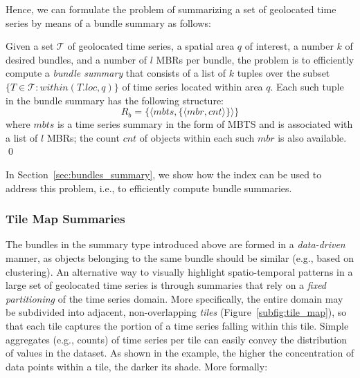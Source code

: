 


Hence, we can formulate the problem of summarizing a set of geolocated time series by means of a bundle summary as follows:

\begin{problem} 
Given a set $\mathcal{T}$ of geolocated time series, a spatial area $q$ of interest, a number $k$ of desired bundles, and a number of $l$ MBRs per bundle, the problem is to efficiently compute a {\em bundle summary} that consists of a list of $k$ tuples over the subset $\{ T \in \mathcal{T} : within(T.loc, q) \}$ of time series located within area $q$. Each such tuple in the bundle summary has the following structure:
\begin{equation} \label{eq:bundles_sum}
R_b = \{ \langle mbts, \{\langle mbr, cnt \rangle \}\rangle\}
\end{equation}
\noindent where $mbts$ is a time series summary in the form of MBTS and is associated with a list of $l$ MBRs; the count $cnt$ of objects within each such $mbr$ is also available.
\qed
\end{problem}

In Section~\ref{sec:bundles_summary}, we show how the \btsr index can be used to address this problem, i.e., to efficiently compute bundle summaries.


\subsubsection{Tile Map Summaries} 
\label{subsec:tilemap_sums}

%

The bundles in the summary type introduced above are formed in a {\em data-driven} manner, as objects belonging to the same bundle should be similar (e.g., based on clustering). An alternative way to visually highlight spatio-temporal patterns in a large set of geolocated time series is through summaries that rely on a {\em fixed partitioning} of the time series domain. More specifically, the entire domain may be subdivided into adjacent, non-overlapping {\em tiles} (Figure~\ref{subfig:tile_map}), so that each tile captures the portion of a time series falling within this tile. Simple aggregates (e.g., counts) of time series per tile can easily convey the distribution of values in the dataset. As shown in the example, the higher the concentration of data points within a tile, the darker its shade. More formally:


